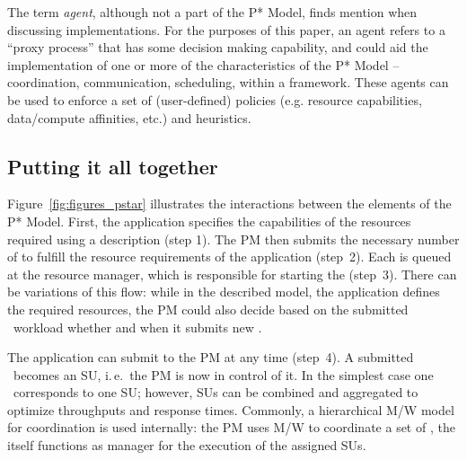 \documentclass{sig-alternate}
\begin{document}
The term {\it agent}, although not a part of the P* Model, finds
mention when discussing implementations. For the purposes of this
paper, an agent refers to a ``proxy process'' 
that has some decision making capability, and could aid the
implementation of one or more of the characteristics of the P* Model
-- coordination, communication, scheduling, within a \pilotjob
framework.  These agents can be used to enforce a set of
(user-defined) policies (e.g.  resource capabilities, data/compute
affinities, etc.) and heuristics.

\subsection{Putting it all together} 


Figure~\ref{fig:figures_pstar}
illustrates the interactions between the elements of the P* Model. First, the application specifies the capabilities of the
resources required using a \pilotjob description (step 1). The PM then
submits the necessary number of \pilots  to fulfill the
resource requirements of the application (step~2). Each \pilot is
queued at the resource manager, which is responsible for starting the
\pilot (step~3). There can be variations of this flow: while in the
described model, the application defines the required resources, the
PM could also decide based on the submitted \cu \ workload whether and
when it submits new \pilots.


The application can submit \cus to the PM at any time (step~4). A
submitted \cu \ becomes an SU, i.\,e.\ the PM is now in control of
it. In the simplest case one \cu \ corresponds to one SU; however,
SUs can be combined and aggregated to optimize throughputs and
response times. Commonly, a hierarchical M/W model for coordination
is used internally: the PM uses M/W to coordinate a set of \pilots,
the \pilot itself functions as manager for the execution of the
assigned SUs.
\end{document}
